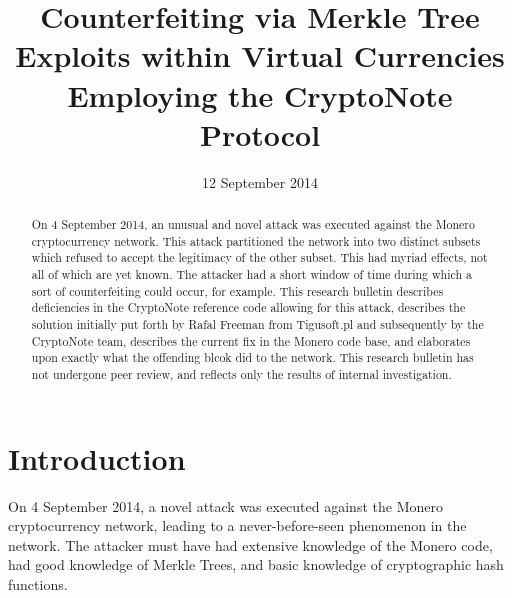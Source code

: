 \documentclass{mrl}
\begin{document}
\begin{frontmatter}

\begin{fmbox}
\hfill\setlength{\fboxrule}{0px}\setlength{\fboxsep}{5px}
\title{Counterfeiting via Merkle Tree Exploits within Virtual Currencies Employing the CryptoNote Protocol}
\date{12 September 2014}
\author[
   addressref={aff1},
]{ }
\author[
   addressref={mrl},
   email={lab@monero.cc}
]{ }
\author[
   addressref={mrl},
   email={lab@monero.cc}
]{ }
\author[
   addressref={mrl},
   email={lab@monero.cc}
]{ }


\address[id=aff1]{
}
\address[id=mrl]{
}
\end{fmbox}

\begin{abstractbox}
\begin{abstract}
On 4 September 2014, an unusual and novel attack was executed against the Monero cryptocurrency network. This attack partitioned the network into two distinct subsets which refused to accept the legitimacy of the other subset. This had myriad effects, not all of which are yet known. The attacker had a short window of time during which a sort of counterfeiting could occur, for example.  This research bulletin describes deficiencies in the CryptoNote reference code allowing for this attack, describes the solution initially put forth by Rafal Freeman from Tigusoft.pl and subsequently by the CryptoNote team, describes the current fix in the Monero code base, and elaborates upon exactly what the offending blcok did to the network.
This research bulletin has not undergone peer review, and reflects only the results of internal investigation.
\end{abstract}
\end{abstractbox}

\end{frontmatter}

\section{Introduction}
On 4 September 2014, a novel attack was executed against the Monero cryptocurrency network, leading to a never-before-seen phenomenon in the network. The attacker must have had extensive knowledge of the Monero code, had good knowledge of Merkle Trees, and basic knowledge of cryptographic hash functions. 
\end{document}
